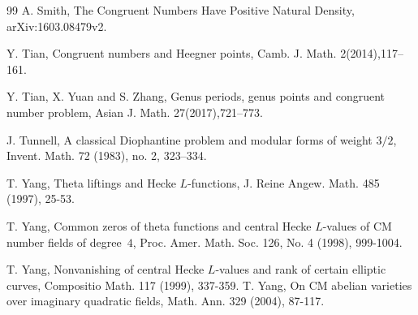 \documentclass[11pt, reqno]{amsart}
\theoremstyle{plain}
\theoremstyle{definition}
\numberwithin{equation}{section}
\begin{document}
\begin{thebibliography}{99}
 A. Smith,  The Congruent Numbers Have Positive Natural Density, arXiv:1603.08479v2.

Y. Tian, Congruent numbers and {H}eegner points, Camb. J. Math. 2(2014),117--161.


Y. Tian, X. Yuan and S. Zhang, Genus periods, genus points and congruent number problem, Asian J. Math. 27(2017),721--773.


 J. Tunnell, 
 A classical Diophantine problem and modular forms of weight  $3/2$, 
Invent. Math. 72 (1983), no. 2, 323–334.

 T. Yang, Theta liftings and Hecke $L$-functions, J. Reine Angew. Math. 485
(1997), 25-53.

 T.  Yang, Common zeros of theta functions and central Hecke $L$-values of CM number fields of degree~$4$, Proc. Amer. Math. Soc. 126, No. 4 (1998), 999-1004.

 T. Yang, Nonvanishing of central Hecke $L$-values and rank of certain elliptic
curves, Compositio Math. 117 (1999), 337-359.
 T. Yang, On CM abelian varieties over imaginary quadratic fields, Math. Ann.
329 (2004), 87-117.


 \end{thebibliography}
\end{document}
